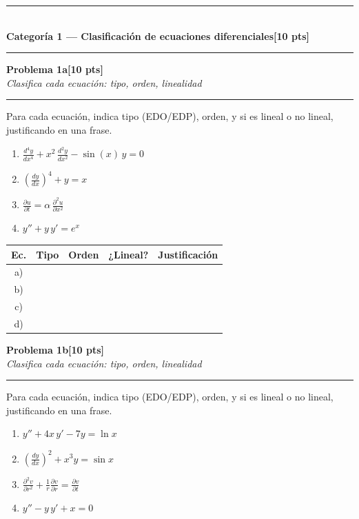 \documentclass[11pt,letterpaper]{article}
\newcommand{\categoria}[3]{%
  \bigskip\bigskip\noindent
  \rule{\linewidth}{0.8pt}\\[2pt]
  {\Large\bfseries Categoría #1 --- #2}\hfill\textbf{[#3 pts]}\\[2pt]
  \rule{\linewidth}{0.8pt}\vspace{4pt}
}
\newcommand{\problema}[3]{%
  \bigskip\noindent
  {\large\textbf{Problema #1}}\hfill\textbf{[#2 pts]}\\[3pt]
  {\small\itshape #3}\par
  \vspace{2pt}\hrule\vspace{8pt}
}
\renewcommand{\arraystretch}{1.3}
\begin{document}
\newpage

\categoria{1}{Clasificación de ecuaciones diferenciales}{10}

\problema{1a}{10}{Clasifica cada ecuación: tipo, orden, linealidad}

Para cada ecuación, indica tipo (EDO/EDP), orden, y si es lineal o no lineal, justificando en una frase.

\begin{enumerate}[label=\textbf{\alph*)}, leftmargin=2em, itemsep=10pt]
  \item $\displaystyle \frac{d^4y}{dx^4} + x^2\,\frac{d^2y}{dx^2} - \sin(x)\,y = 0$
  \item $\displaystyle \left(\frac{dy}{dx}\right)^{4} + y = x$
  \item $\displaystyle \frac{\partial u}{\partial t} = \alpha\,\frac{\partial^2 u}{\partial x^2}$
  \item $\displaystyle y'' + y\,y' = e^x$
\end{enumerate}

\renewcommand{\arraystretch}{2.6}
\noindent\begin{tabular}{|c|>{\centering\arraybackslash}p{1.6cm}|>{\centering\arraybackslash}p{1.6cm}|>{\centering\arraybackslash}p{2cm}|>{\arraybackslash}p{6.3cm}|}
\hline
\textbf{Ec.} & \textbf{Tipo} & \textbf{Orden} & \textbf{¿Lineal?} & \textbf{Justificación} \\
\hline
a) & & & & \\
\hline
b) & & & & \\
\hline
c) & & & & \\
\hline
d) & & & & \\
\hline
\end{tabular}
\renewcommand{\arraystretch}{1.3}

\problema{1b}{10}{Clasifica cada ecuación: tipo, orden, linealidad}

Para cada ecuación, indica tipo (EDO/EDP), orden, y si es lineal o no lineal, justificando en una frase.

\begin{enumerate}[label=\textbf{\alph*)}, leftmargin=2em, itemsep=10pt]
  \item $\displaystyle y'' + 4x\,y' - 7y = \ln x$
  \item $\displaystyle \left(\frac{dy}{dx}\right)^{2} + x^3 y = \sin x$
  \item $\displaystyle \frac{\partial^2 v}{\partial r^2} + \frac{1}{r}\frac{\partial v}{\partial r} = \frac{\partial v}{\partial t}$
  \item $\displaystyle y'' - y\,y' + x = 0$
\end{enumerate}
\end{document}
